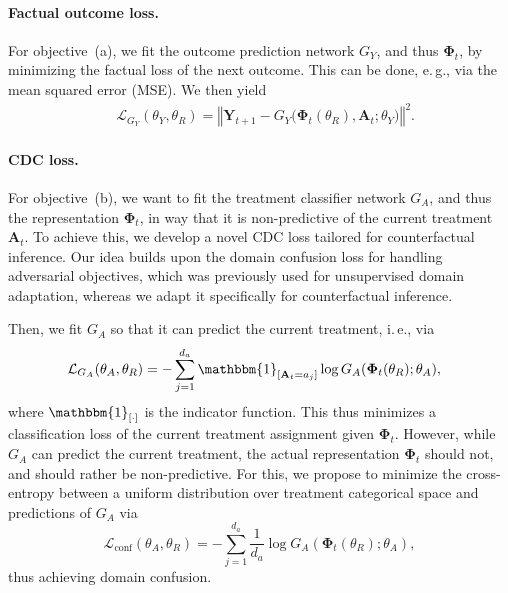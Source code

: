 \documentclass{article}
\newcommand\ie{i.\,e.\xspace}
\newcommand\eg{e.\,g.\xspace}
\theoremstyle{plain}
\theoremstyle{definition}
\theoremstyle{remark}
\begin{document}
\paragraph{Factual outcome loss.} For objective~(a), we fit the outcome prediction network $G_Y$, and thus $\mathbf{\Phi}_t$, by minimizing the factual loss of the next outcome. This can be done, \eg, via the mean squared error (MSE). We then yield
\begin{align}
    & \mathcal{L}_{G_Y} (\theta_Y, \theta_R) = \left\Vert \mathbf{Y}_{t+1} - G_Y\big(\mathbf{\Phi}_t(\theta_R), \mathbf{A}_t; \theta_Y \big) \right\Vert^2 .
\end{align}

\paragraph{CDC loss.} For objective~(b), we want to fit the treatment classifier network $G_A$, and thus the representation $\mathbf{\Phi}_t$, in way that it is non-predictive of the current treatment $\mathbf{A}_t$. To achieve this, we develop a novel CDC loss tailored for counterfactual inference. Our idea builds upon the domain confusion loss \cite{tzeng2015simultaneous} for handling adversarial objectives, which was previously used for unsupervised domain adaptation, whereas we adapt it specifically for counterfactual inference. 

Then, we fit $G_A$ so that it can predict the current treatment, \ie, via 
\begin{equation}
\label{eq:loss-ga}
\hspace{-0.3cm}
\mathcal{L}_{G_A} (\theta_A, \theta_R) = - \sum_{j=1}^{d_a} \mathbbm{1}_{[\mathbf{A}_t = a_j]} \log G_A (\mathbf{\Phi}_t(\theta_R); \theta_A) , 
\end{equation}
where $\mathbbm{1}_{[\cdot]}$ is the indicator function. This thus minimizes a classification loss of the current treatment assignment given $\mathbf{\Phi}_t$. However, while $G_A$ can predict the current treatment, the actual representation $\mathbf{\Phi}_t$ should not, and should rather be non-predictive. For this, we propose to minimize the cross-entropy between a uniform distribution over treatment categorical space and predictions of $G_A$ via
\begin{equation}
\label{eq:loss-conf}
\mathcal{L}_{\text{conf}} (\theta_A, \theta_R) = - \sum_{j=1}^{d_a} \frac{1}{d_a} \log G_A (\mathbf{\Phi}_t(\theta_R); \theta_A) ,
\end{equation}
thus achieving domain confusion. 
\end{document}

